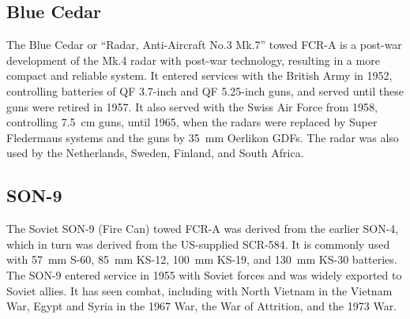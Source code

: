 \subsection{Blue Cedar}

The Blue Cedar or “Radar, Anti-Aircraft No.3 Mk.7” towed FCR-A is a post-war development of the Mk.4 radar with post-war technology, resulting in a more compact and reliable system.
It entered services with the British Army in 1952, controlling batteries of QF 3.7-inch and QF 5.25-inch guns, and served until these guns were retired in 1957. It also served with the Swiss Air Force from 1958, controlling 7.5~cm guns, until 1965, when the radars were replaced by Super Fledermaus systems and the guns by 35~mm Oerlikon GDFs. The radar was also used by the Netherlands, Sweden, Finland, and South Africa.%

\subsection{SON-9}

The Soviet SON-9 (Fire Can) towed FCR-A was derived from the earlier SON-4, which in turn was derived from the US-supplied SCR-584.
It is commonly used with 57~mm S-60, 85~mm KS-12, 100~mm KS-19, and 130~mm KS-30 batteries.
The SON-9 entered service in 1955 with Soviet forces and was widely exported to Soviet allies.
It has seen combat, including with North Vietnam in the Vietnam War, Egypt and Syria in the 1967 War, the War of Attrition, and the 1973 War.%

